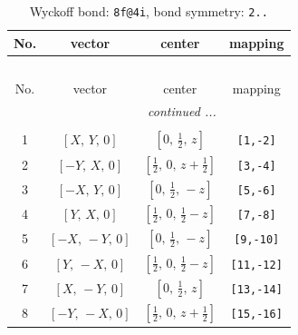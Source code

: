 \documentclass[fleqn,8pt]{jsarticle}
\begin{document}
\begin{longtable}{cccc}
\caption{Wyckoff bond: {\tt 8f@4i}, bond symmetry: {\tt 2..}}
 \\
 \hline \hline
No. & vector & center & mapping \\ \hline \endfirsthead

\multicolumn{3}{l}{\tablename\ \thetable{}} \\
 \hline \hline
No. & vector & center & mapping \\ \hline \endhead

 \hline \hline
\multicolumn{3}{r}{\footnotesize\it continued ...} \\ \endfoot

 \hline \hline
\multicolumn{3}{r}{} \\ \endlastfoot

1 & $\left[ X,\, Y,\, 0 \right]$ & $\left[ 0,\, \frac{1}{2},\, z \right]$ & {\tt [1,-2]} \\ \hline
2 & $\left[ - Y,\, X,\, 0 \right]$ & $\left[ \frac{1}{2},\, 0,\, z + \frac{1}{2} \right]$ & {\tt [3,-4]} \\ \hline
3 & $\left[ - X,\, Y,\, 0 \right]$ & $\left[ 0,\, \frac{1}{2},\, - z \right]$ & {\tt [5,-6]} \\ \hline
4 & $\left[ Y,\, X,\, 0 \right]$ & $\left[ \frac{1}{2},\, 0,\, \frac{1}{2} - z \right]$ & {\tt [7,-8]} \\ \hline
5 & $\left[ - X,\, - Y,\, 0 \right]$ & $\left[ 0,\, \frac{1}{2},\, - z \right]$ & {\tt [9,-10]} \\ \hline
6 & $\left[ Y,\, - X,\, 0 \right]$ & $\left[ \frac{1}{2},\, 0,\, \frac{1}{2} - z \right]$ & {\tt [11,-12]} \\ \hline
7 & $\left[ X,\, - Y,\, 0 \right]$ & $\left[ 0,\, \frac{1}{2},\, z \right]$ & {\tt [13,-14]} \\ \hline
8 & $\left[ - Y,\, - X,\, 0 \right]$ & $\left[ \frac{1}{2},\, 0,\, z + \frac{1}{2} \right]$ & {\tt [15,-16]} \\
\end{longtable}
\renewcommand{\arraystretch}{1.2}
\end{document}
